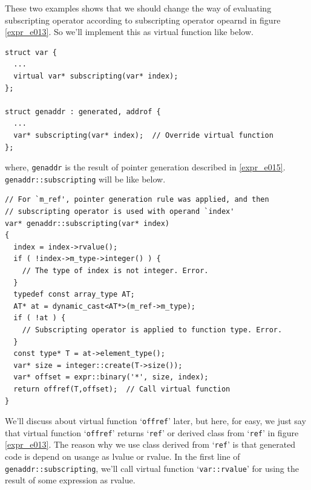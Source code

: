 These two examples shows that we should change the way of evaluating
subscripting operator according to subscripting operator opearnd
in figure \ref{expr_e013}. So we'll implement this as virtual function
like below.
\begin{verbatim}
struct var {
  ...
  virtual var* subscripting(var* index);
};

struct genaddr : generated, addrof {
  ...
  var* subscripting(var* index);  // Override virtual function
};
\end{verbatim}
where, {\tt{genaddr}} is the result of pointer generation described in
\ref{expr_e015}. {\tt{genaddr::subscripting}} will be like below.
\begin{verbatim}
// For `m_ref', pointer generation rule was applied, and then
// subscripting operator is used with operand `index'
var* genaddr::subscripting(var* index)
{
  index = index->rvalue();
  if ( !index->m_type->integer() ) {
    // The type of index is not integer. Error. 
  }
  typedef const array_type AT;
  AT* at = dynamic_cast<AT*>(m_ref->m_type);
  if ( !at ) {
    // Subscripting operator is applied to function type. Error.
  }
  const type* T = at->element_type();
  var* size = integer::create(T->size());
  var* offset = expr::binary('*', size, index);
  return offref(T,offset);  // Call virtual function
}
\end{verbatim}
We'll discuss about virtual function `{\tt{offref}}' later,
but here, for easy, we just say that virtual function `{\tt{offref}}'
returns `{\tt{ref}}' or derived class from `{\tt{ref}}' in
figure \ref{expr_e013}.
The reason why we use class derived from `{\tt{ref}}' is
that generated code is depend on usange as lvalue or rvalue.
In the first line of {\tt{genaddr::subscripting}}, we'll call virtual function
`{\tt{var::rvalue}}' for using the result of some expression as rvalue.

